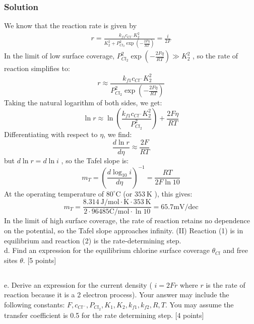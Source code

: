 \documentclass[12pt]{article}
\begin{document}
\subsubsection{Solution}
We know that the reaction rate is given by
\begin{align}
    r=\frac{k_{f 1} c_{C l^{-}} K_{2} ^2 }{K_{2} ^2 +P_{C l_{2}}^2\exp\left(-\frac{2 F \eta}{R T}\right)} = \frac{i}{2 F}
\end{align}
In the limit of low surface coverage, $P_{C l_{2}}^2\exp\left(-\frac{2 F \eta}{R T}\right) \gg K_{2} ^2$ , so the rate of reaction simplifies to:
\begin{equation}
r \approx \frac{k_{f 1} c_{C l^{-}} K_{2} ^2 }{P_{C l_{2}}^2\exp\left(-\frac{2 F \eta}{R T}\right)} 
\end{equation}
Taking the natural logarithm of both sides, we get:
\begin{equation}
\ln r \approx \ln\left(\frac{k_{f 1} c_{C l^{-}} K_{2} ^2 }{P_{C l_{2}}^2}\right) + \frac{2 F \eta}{R T}
\end{equation}
Differentiating with respect to $\eta$, we find:
\begin{equation}
\frac{d \ln r}{d \eta} \approx \frac{2 F}{R T}
\end{equation}
but $ d \ln r=d \ln i$ , so the Tafel slope is:
\begin{equation}
m_T=\left(\frac{d \log_{10} i}{d \eta}\right)^{-1}=\frac{R T}{2 F \ln 10}
\end{equation}
At the operating temperature of $80^{\circ} \mathrm{C}$ (or $353 \mathrm{~K}$ ), this gives:
\begin{equation}
m_T=\frac{8.314 \mathrm{~J} / \mathrm{mol} \cdot \mathrm{K} \cdot 353 \mathrm{~K}}{2 \cdot 96485 \mathrm{C} / \mathrm{mol} \cdot \ln 10}=65.7 \mathrm{mV} / \mathrm{dec}
\end{equation}
In the limit of high surface coverage, the rate of reaction retains no dependence on the potential, so the Tafel slope approaches infinity.
(II) Reaction (1) is in equilibrium and reaction (2) is the rate-determining step.\\
d. Find an expression for the equilibrium chlorine surface coverage $\theta_{C l}$ and free sites $\theta$. [5 points]\\
\subsection{}
e. Derive an expression for the current density ( $i=2 F r$ where $r$ is the rate of reaction because it is a 2 electron process). Your answer may include the following constants: $F, c_{C l^{-}}, P_{C l_{2}}, K_{1}, K_{2}, k_{f 1}, k_{f 2}, R, T$. You may assume the transfer coefficient is 0.5 for the rate determining step. [4 points]\\[0pt]
\end{document}
